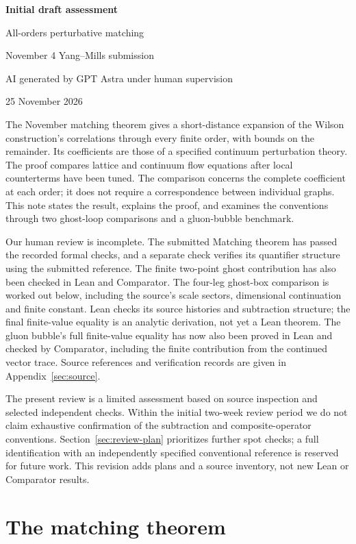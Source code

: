 \documentclass[11pt]{article}
\begin{document}
\begin{center}
{\large\bfseries Initial draft assessment}\par
{\large All-orders perturbative matching}\par
{\small November 4 Yang--Mills submission}\par
{\small AI generated by GPT Astra under human supervision}\par
{\small 25 November 2026}
\end{center}

The November matching theorem gives a short-distance expansion of the
Wilson construction's correlations through every finite order, with bounds
on the remainder. Its coefficients are those of a specified continuum
perturbation theory. The proof compares
lattice and continuum flow equations after local counterterms have been
tuned. The comparison concerns the complete coefficient at each order;
it does not require a correspondence between individual graphs. This note
states the result, explains the proof, and examines the conventions through
two ghost-loop comparisons and a gluon-bubble benchmark.

Our human review is incomplete. The submitted Matching theorem has passed
the recorded formal checks, and a separate check verifies its quantifier
structure using the submitted reference. The finite two-point ghost
contribution has also been checked in Lean and Comparator. The four-leg
ghost-box comparison is worked out below, including the source's scale
sectors, dimensional continuation and finite constant. Lean checks its
source histories and subtraction structure; the final finite-value equality
is an analytic derivation, not yet a Lean theorem. The gluon bubble's full finite-value equality has now also been proved in Lean and checked by Comparator, including the finite contribution from the continued vector trace. Source references
and verification records are given
in Appendix~\ref{sec:source}.

The present review is a limited assessment based on source inspection and
selected independent checks. Within the initial two-week review period we
do not claim exhaustive confirmation of the subtraction and composite-operator
conventions. Section~\ref{sec:review-plan} prioritizes further spot checks;
a full identification with an independently specified conventional reference
is reserved for future work. This revision adds plans and a source inventory,
not new Lean or Comparator results.

\section{The matching theorem}
\label{sec:result}
\end{document}
